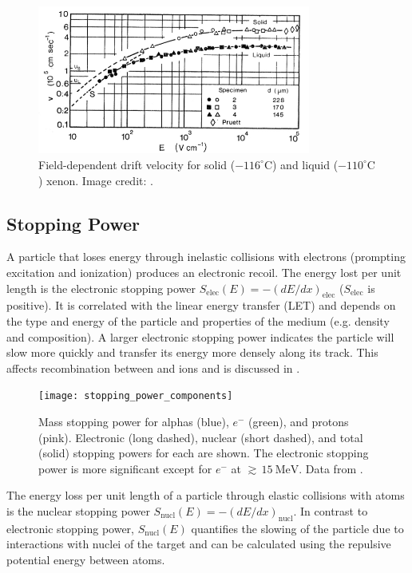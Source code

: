 \begin{figure}
\includegraphics[angle=0.5, width=0.8\textwidth]{DriftVelocity}
\caption{Field-dependent drift velocity for solid ($-116^{\circ}\mathrm{C}$) and liquid ($-110^{\circ}\mathrm{C}$) xenon.  Image credit:
.}
\label{fig:drift_velocity}
\end{figure}




\subsection{Stopping Power}
\label{subsec:stopping_power}
A particle that loses energy through inelastic collisions with electrons (prompting excitation and ionization) produces an electronic
recoil.  The energy lost per unit
length is the electronic stopping power $S_{\mathrm{elec}}(E) = -(dE/dx)_{\mathrm{elec}}$ ($S_{\mathrm{elec}}$ is positive).  It is
correlated with the linear energy transfer (LET) and depends on the type and energy of the particle and properties of the
medium (e.g. density and composition).  A larger electronic stopping power indicates the particle will slow more quickly and
transfer its energy more densely along its track.  This affects recombination between \electron and ions and is discussed in
.

\begin{figure}[t]
\texttt{[image: stopping\_power\_components]}
\caption{Mass stopping power for alphas (blue), $e^{-}$ (green), and protons (pink).  Electronic (long dashed), nuclear (short dashed),
and total (solid) stopping powers for each are shown.  The electronic stopping power is more significant except for $e^-$ at
${\gtrsim}\, 15\ \mathrm{MeV}$.  Data from .}
\label{fig:mass_stopping_power}
\end{figure}

The energy loss per unit length of a particle through elastic collisions with atoms is the nuclear stopping power
$S_{\mathrm{nucl}}(E) = -(dE/dx)_{\mathrm{nucl}}$.  In contrast to electronic stopping power,
$S_{\mathrm{nucl}}(E)$ quantifies the slowing of the particle due to interactions with nuclei of the target and can be calculated using
the repulsive potential energy between atoms.


